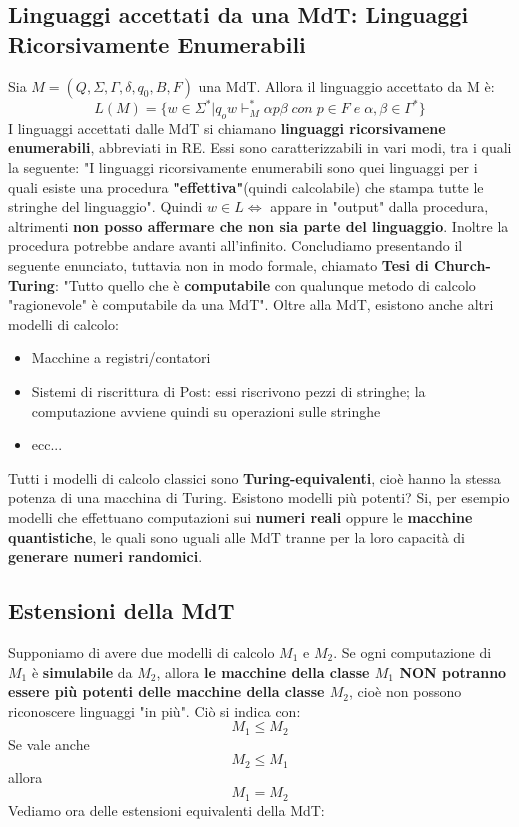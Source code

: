 \documentclass[12pt]{article}
\begin{document}
\subsection{Linguaggi accettati da una MdT: Linguaggi Ricorsivamente Enumerabili}
Sia $M = (Q, \Sigma, \Gamma, \delta, q_0, B, F)$ una MdT. Allora il linguaggio accettato da M è:
$$L(M) = \{w \in \Sigma^* | q_ow \vdash^*_M \alpha p \beta \; con \; p \in F \; e \; \alpha,\beta \in \Gamma^*\}$$
I linguaggi accettati dalle MdT si chiamano \textbf{linguaggi ricorsivamene enumerabili}, abbreviati in RE. Essi sono caratterizzabili in vari modi, tra i quali la seguente: "I linguaggi ricorsivamente enumerabili sono quei linguaggi per i quali esiste una procedura \textbf{"effettiva"}(quindi calcolabile) che stampa tutte le stringhe del linguaggio". Quindi $w \in L \Leftrightarrow$ appare in "output" dalla procedura, altrimenti \textbf{non posso affermare che non sia parte del linguaggio}. Inoltre la procedura potrebbe andare avanti all'infinito. Concludiamo presentando il seguente enunciato, tuttavia non in modo formale, chiamato \textbf{Tesi di Church-Turing}: "Tutto quello che è \textbf{computabile} con qualunque metodo di calcolo "ragionevole" è computabile da una MdT". Oltre alla MdT, esistono anche altri modelli di calcolo:
\begin{itemize}
    \item Macchine a registri/contatori
    \item Sistemi di riscrittura di Post: essi riscrivono pezzi di stringhe; la computazione avviene quindi su operazioni sulle stringhe
    \item ecc...
\end{itemize}
Tutti i modelli di calcolo classici sono \textbf{Turing-equivalenti}, cioè hanno la stessa potenza di una macchina di Turing. Esistono modelli più potenti? Si, per esempio modelli che effettuano computazioni sui \textbf{numeri reali} oppure le \textbf{macchine quantistiche}, le quali sono uguali alle MdT tranne per la loro capacità di \textbf{generare numeri randomici}.
\subsection{Estensioni della MdT}
Supponiamo di avere due modelli di calcolo $M_1$ e $M_2$. Se ogni computazione di $M_1$ è \textbf{simulabile} da $M_2$, allora \textbf{le macchine della classe $M_1$ NON potranno essere più potenti delle macchine della classe $M_2$}, cioè non possono riconoscere linguaggi "in più". Ciò si indica con:
$$M_1 \leq M_2$$
Se vale anche
$$M_2 \leq M_1$$
allora
$$M_1 = M_2$$
Vediamo ora delle estensioni equivalenti della MdT:
\end{document}
